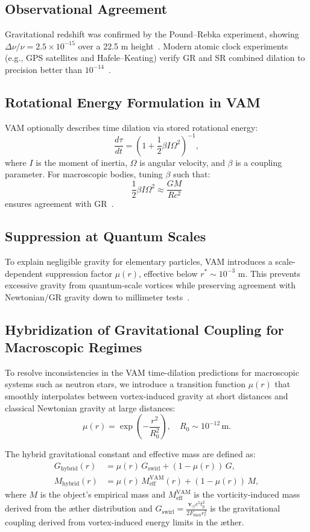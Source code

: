 \subsection*{Observational Agreement}
Gravitational redshift was confirmed by the Pound–Rebka experiment, showing $\Delta\nu/\nu = 2.5\times 10^{-15}$ over a 22.5 m height~\cite{pound1960apparent}. Modern atomic clock experiments (e.g., GPS satellites and Hafele–Keating) verify GR and SR combined dilation to precision better than $10^{-14}$~\cite{ashby2003relativity}.

\subsection*{Rotational Energy Formulation in VAM}
VAM optionally describes time dilation via stored rotational energy:
\[
    \frac{d\tau}{dt} = \left(1 + \frac{1}{2}\beta I \Omega^2\right)^{-1},
\]
where $I$ is the moment of inertia, $\Omega$ is angular velocity, and $\beta$ is a coupling parameter. For macroscopic bodies, tuning $\beta$ such that:
\[
    \frac{1}{2} \beta I \Omega^2 \approx \frac{GM}{Rc^2}
\]
ensures agreement with GR~\cite{iskandarani2025VAM2}.

\subsection*{Suppression at Quantum Scales}
To explain negligible gravity for elementary particles, VAM introduces a scale-dependent suppression factor $\mu(r)$, effective below $r^* \sim 10^{-3}$ m. This prevents excessive gravity from quantum-scale vortices while preserving agreement with Newtonian/GR gravity down to millimeter tests~\cite{adelberger2003tests}.

\subsection{Hybridization of Gravitational Coupling for Macroscopic Regimes}

To resolve inconsistencies in the VAM time-dilation predictions for macroscopic systems such as neutron stars, we introduce a transition function \(\mu(r)\) that smoothly interpolates between vortex-induced gravity at short distances and classical Newtonian gravity at large distances:
\[
    \mu(r) = \exp\left(-\frac{r^2}{R_0^2}\right), \quad R_0 \sim 10^{-12} \, \mathrm{m}.
\]

The hybrid gravitational constant and effective mass are defined as:
\begin{align*}
    G_{\text{hybrid}}(r) &= \mu(r) \, G_{\text{swirl}} + (1 - \mu(r)) \, G, \\
    M_{\text{hybrid}}(r) &= \mu(r) \, M_{\text{eff}}^{\text{VAM}}(r) + (1 - \mu(r)) \, M,
\end{align*}
where \(M\) is the object's empirical mass and \(M_{\text{eff}}^{\text{VAM}}\) is the vorticity-induced mass derived from the æther distribution and $G_{\text{swirl}} = \frac{\mathbf{v}_{\scriptscriptstyle\boldsymbol{\circlearrowleft}} c^5 t_p^2}{2 F_{\max} r_c^2}$ is the gravitational coupling derived from vortex-induced energy limits in the æther.


